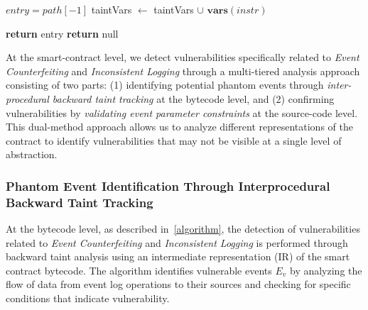 \begin{algorithm}[t]
\begin{algorithmic}[1]
  \State $entry = path[-1]$  \label{begin:taintanalysis}
        \State taintVars $\gets$ taintVars $\cup$ $\textbf{vars}(instr)$  
    \EndIf
  \EndFor

    \State \textbf{return} entry
  \Else 
    \State \textbf{return} null  \label{end:taintanalysis}
  \EndIf 
  
\EndProcedure 


  \end{algorithmic}
  \label{algorithm}
\end{algorithm}


At the smart-contract level, we detect vulnerabilities specifically related to \emph{Event Counterfeiting} and \emph{Inconsistent Logging} through a multi-tiered analysis approach consisting of two parts: (1) identifying potential phantom events through \emph{inter-procedural backward taint tracking} at the bytecode level, and (2) confirming vulnerabilities by \emph{validating event parameter constraints} at the source-code level.
This dual-method approach allows us to analyze different representations of the contract to
identify vulnerabilities that may not be visible at a single level of abstraction.

\subsubsection{Phantom Event Identification Through Interprocedural Backward Taint Tracking}
At the bytecode level, as described in~\cref{algorithm}, the detection of vulnerabilities related to \emph{Event Counterfeiting} and \emph{Inconsistent Logging} is performed through backward taint analysis using an intermediate representation (IR) of the smart contract bytecode. The algorithm identifies vulnerable events \(E_v\) by analyzing the flow of data from event log operations to their sources and checking for specific conditions that indicate vulnerability.

